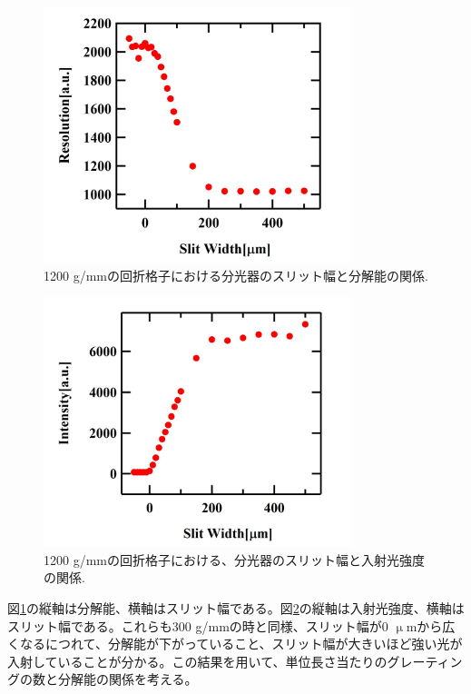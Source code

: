 \documentclass[11pt,a4j]{jsarticle}
\begin{document}
\begin{enumerate}
       \begin{figure}[t]
        \centering
        \includegraphics[clip,width=9cm]{start1_1200Resolution.jpg}
        \caption{1200 g/mmの回折格子における分光器のスリット幅と分解能の関係.}
        \label{fig_1200_resolution1}
       \end{figure}

       \newpage

       \begin{figure}[ht]
        \centering
        \includegraphics[clip,width=9cm]{start1_1200Intensity.jpg}
        \caption{1200 g/mmの回折格子における、分光器のスリット幅と入射光強度の関係.}
        \label{fig_1200_Int1}
       \end{figure}

       図\ref{fig_1200_resolution1}の縦軸は分解能、横軸はスリット幅である。図\ref{fig_1200_Int1}の縦軸は入射光強度、横軸はスリット幅である。これらも300 g/mmの時と同様、スリット幅が0 $\upmu$mから広くなるにつれて、分解能が下がっていること、スリット幅が大きいほど強い光が入射していることが分かる。この結果を用いて、単位長さ当たりのグレーティングの数と分解能の関係を考える。


\end{enumerate}
\end{document}
